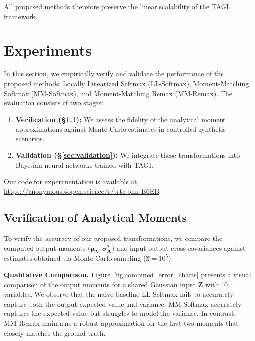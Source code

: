 \documentclass{uai2026} %
\begin{document}
All proposed methods therefore preserve the linear scalability of the TAGI framework. 

\section{Experiments}
\label{sec:experiments}

In this section, we empirically verify and validate the performance of the proposed methods: Locally Linearized Softmax (LL-Softmax), Moment-Matching Softmax (MM-Softmax), and Moment-Matching Remax (MM-Remax). The evaluation consists of two stages:
\begin{enumerate}
    \item \textbf{Verification (\S\ref{sec:verification}):} We assess the fidelity of the analytical moment approximations against Monte Carlo estimates in controlled synthetic scenarios.
    \item \textbf{Validation (\S\ref{sec:validation}):} We integrate these transformations into Bayesian neural networks trained with TAGI.
\end{enumerate}
Our code for experimentation is available at \url{https://anonymous.4open.science/r/trtc-bnn-B6EB}.

\subsection{Verification of Analytical Moments}
\label{sec:verification}

To verify the accuracy of our proposed transformations, we compare the computed output moments ($\bm{\mu}_{\bm{A}}, \bm{\sigma}_{\bm{A}}^2$) and input-output cross-covariances against estimates obtained via Monte Carlo sampling ($\mathtt{N}=10^5$).

\textbf{Qualitative Comparison.}
Figure~\ref{fig:combined_error_charts} presents a visual comparison of the output moments for a shared Gaussian input $\bm{Z}$ with 10 variables. We observe that the naive baseline LL-Softmax fails to accurately capture both the output expected value and variance. MM-Softmax accurately captures the expected value but struggles to model the variance. In contrast, MM-Remax maintains a robust approximation for the first two moments that closely matches the ground truth.
\end{document}
